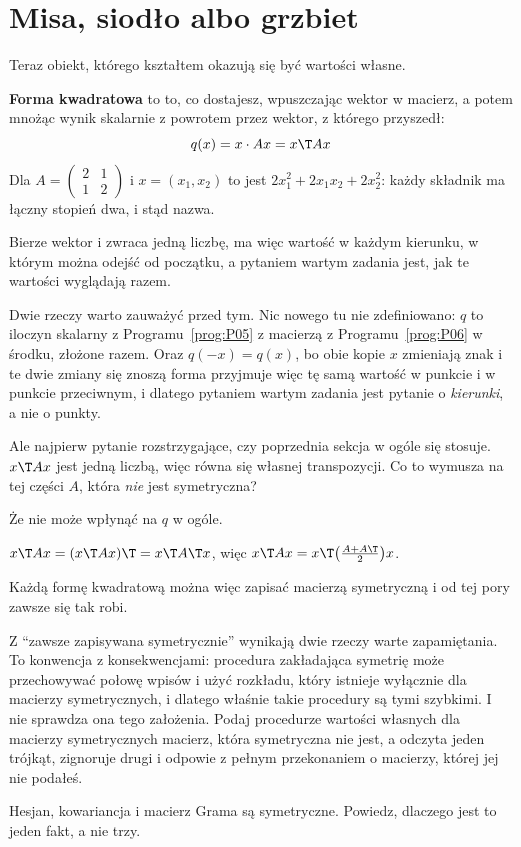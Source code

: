 \section{Misa, siodło albo grzbiet}
\label{sec:P10-forms}

\begin{fr}
Teraz obiekt, którego kształtem okazują się być wartości własne.

\textbf{Forma kwadratowa} to to, co dostajesz, wpuszczając wektor w macierz, a
potem mnożąc wynik skalarnie z powrotem przez wektor, z którego przyszedł:
\[ q(x) = x \cdot Ax = x\T A x \]
Dla $A = \begin{pmatrix} 2 & 1 \\ 1 & 2 \end{pmatrix}$ i $x = (x_1, x_2)$ to
jest $2x_1^{2} + 2x_1x_2 + 2x_2^{2}$: każdy składnik ma łączny stopień dwa, i
stąd nazwa.

Bierze wektor i zwraca jedną liczbę, ma więc wartość w każdym kierunku, w
którym można odejść od początku, a pytaniem wartym zadania jest, jak te
wartości wyglądają razem.

Dwie rzeczy warto zauważyć przed tym. Nic nowego tu nie zdefiniowano:
$q$ to iloczyn skalarny z Programu~\ref{prog:P05} z macierzą z
Programu~\ref{prog:P06} w środku, złożone razem. Oraz $q(-x) = q(x)$, bo obie
kopie $x$ zmieniają znak i te dwie zmiany się znoszą \dash{} forma przyjmuje
więc tę samą wartość w punkcie i w punkcie przeciwnym, i dlatego pytaniem
wartym zadania jest pytanie o \emph{kierunki}, a nie o punkty.

Ale najpierw pytanie rozstrzygające, czy poprzednia sekcja w ogóle się stosuje.
$x\T Ax$ jest jedną liczbą, więc równa się własnej transpozycji. Co to wymusza
na tej części $A$, która \emph{nie} jest symetryczna?
\dotline
\nextframe
\end{fr}

\begin{fr}
\begin{ansblock}
Że nie może wpłynąć na $q$ w ogóle.
\end{ansblock}

$x\T A x = (x\T A x)\T = x\T A\T x$, więc $x\T A x = x\T \big(\frac{A + A\T}{2}
\big) x$.

Każdą formę kwadratową można więc zapisać macierzą symetryczną i od tej pory
zawsze się tak robi.

Z \enquote{zawsze zapisywana symetrycznie} wynikają dwie rzeczy warte
zapamiętania. To konwencja z konsekwencjami: procedura zakładająca symetrię
może przechowywać połowę wpisów i użyć rozkładu, który istnieje wyłącznie dla
macierzy symetrycznych, i dlatego właśnie takie procedury są tymi szybkimi.
I nie sprawdza ona tego założenia. Podaj procedurze wartości własnych dla
macierzy symetrycznych macierz, która symetryczna nie jest, a odczyta jeden
trójkąt, zignoruje drugi i odpowie z pełnym przekonaniem o macierzy, której jej
nie podałeś.

Hesjan, kowariancja i macierz Grama są symetryczne. Powiedz, dlaczego jest to
jeden fakt, a nie trzy.
\dotline
\nextframe
\end{fr}

